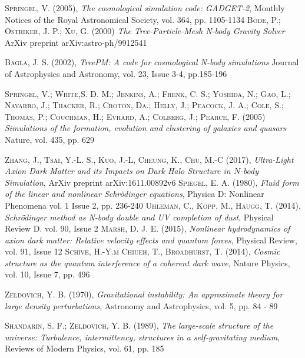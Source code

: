 \documentclass[a4paper,openright,12pt]{book}
\begin{document}
\begin{thebibliography}{a}
 \textsc{Springel, V. (2005)},
\textit{The cosmological simulation code: GADGET-2},
Monthly Notices of the Royal Astronomical Society, vol. 364, pp. 1105-1134
 \textsc{Bode, P.; Ostriker, J. P.; Xu, G. (2000)}
\textit{The Tree-Particle-Mesh N-body Gravity Solver}
ArXiv preprint arXiv:astro-ph/9912541 


 \textsc{Bagla, J. S. (2002)},
\textit{TreePM: A code for cosmological N-body simulations}
Journal of Astrophysics and Astronomy, vol. 23, Issue 3-4, pp.185-196

 \textsc{Springel, V.; White,S. D. M.; Jenkins, A.; Frenk, C. S.; Yoshida, N.; Gao, L.; Navarro, J.; Thacker, R.; Croton, Da.; Helly, J.; Peacock, J. A.; Cole, S.; Thomas, P.; Couchman, H.; Evrard, A.; Colberg, J.; Pearce, F. (2005)}
\textit{Simulations of the formation, evolution and clustering of galaxies and quasars}
Nature, vol. 435, pp. 629

 \textsc{Zhang, J., Tsai, Y.-L. S., Kuo, J.-L, Cheung, K., Chu, M.-C (2017)},
\textit{Ultra-Light Axion Dark Matter and its Impacts on Dark Halo Structure in $N$-body Simulation},
ArXiv preprint  arXiv:1611.00892v6
 \textsc{Spiegel, E. A. (1980)},
\textit{Fluid form of the linear and nonlinear Schrödinger equations},
Physica D: Nonlinear Phenomena vol. 1 Issue 2, pp. 236-240 
 \textsc{Uhleman, C., Kopp, M., Haugg, T. (2014)},
\textit{Schrödinger method as N-body double and UV completion of dust},
Physical Review D. vol. 90, Issue 2 
\textsc{Marsh, D. J. E. (2015)},
\textit{Nonlinear hydrodynamics of axion dark matter: Relative velocity effects and quantum forces},
Physical Review, vol. 91, Issue 12
 \textsc{Schive, H.-Y.m Chiueh, T., Broadhurst, T. (2014)},
\textit{Cosmic structure as the quantum interference of a coherent dark wave},
Nature Physics, vol. 10, Issue 7, pp. 496

 \textsc{Zeldovich, Y. B. (1970)},
\textit{Gravitational instability: An approximate theory for large density perturbations},
Astronomy and Astrophysics, vol. 5, pp. 84 - 89

 \textsc{Shandarin, S. F.; Zeldovich, Y. B. (1989)},
\textit{The large-scale structure of the universe: Turbulence, intermittency, structures in a self-gravitating medium},
Reviews of Modern Physics, vol. 61, pp. 185


\end{thebibliography}
\end{document}
